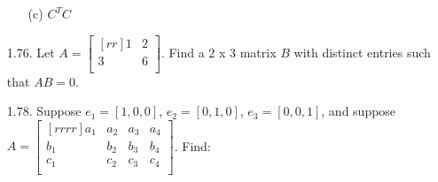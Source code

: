 \documentclass[12pt]{article}
\begin{document}
\begin{enumerate}
\begin{enumerate}
	\item[(c)] $C^T C$
	\end{enumerate}
\item[1.76.] Let $A=\begin{bmatrix}[rr] 1 & 2\\ 3 & 6\\ \end{bmatrix}$.
	Find a 2 x 3 matrix $B$ with distinct entries such that $AB = 0$.
\item[1.78.] Suppose $e_1=[1,0,0]$, $e_2=[0,1,0]$, $e_3=[0,0,1]$, and suppose $A=
\begin{bmatrix}[rrrr]
a_1 & a_2 & a_3 & a_4\\
b_1 & b_2 & b_3 & b_4\\
c_1 & c_2 & c_3 & c_4\\
\end{bmatrix}$. Find:
\end{enumerate}
\end{document}
